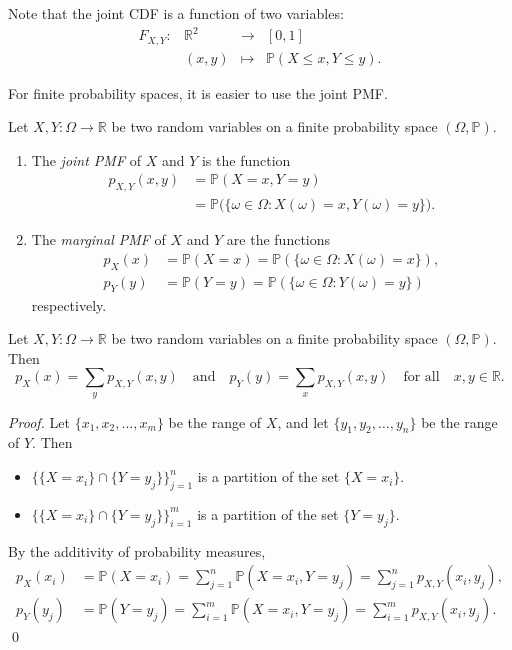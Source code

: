 \documentclass[lecture]{csm}
\newcommand{\R}{\mathbb{R}}
\newcommand{\prob}{\mathbb{P}}
\def\it{\item}
\def\bit{\begin{itemize}}
\def\eit{\end{itemize}}
\def\ben{\begin{enumerate}}
\def\een{\end{enumerate}}
\begin{document}
Note that the joint CDF is a function of two variables:
\[
\begin{array}{cccl}
F_{X,Y}:	& \mathbb{R}^2	& \longrightarrow	& [0,1] \\
		& (x,y) 			& \mapsto			& \prob(X\leq x, Y\leq y).
\end{array}
\]

\newpage %

For finite probability spaces, it is easier to use the joint PMF.

\begin{definition}
Let $X,Y:\Omega\to\R$ be two random variables on a finite probability space $(\Omega,\prob)$.
\ben
\it The \emph{joint PMF} of $X$ and $Y$ is the function
\begin{align*}
p_{X,Y}(x,y) 
	& = \prob(X=x, Y=y) \\
	& = \prob\big(\{\omega\in\Omega : X(\omega)=x, Y(\omega)=y\}\big).
\end{align*}
\it The \emph{marginal PMF} of $X$ and $Y$ are the functions
\begin{align*}
p_X(x)	& = \prob(X=x) = \prob(\{\omega\in\Omega : X(\omega)=x\}), \\
p_Y(y)	& = \prob(Y=y) = \prob(\{\omega\in\Omega : Y(\omega)=y\})
\end{align*}
respectively.
\een
\end{definition}

\newpage

\begin{lemma}
Let $X,Y:\Omega\to\R$ be two random variables on a finite probability space $(\Omega,\prob)$. Then
\[
p_X(x) = \sum_y p_{X,Y}(x,y) \quad\text{and}\quad p_Y(y) = \sum_x p_{X,Y}(x,y) \quad\text{for all}\quad x,y\in\R.
\]
\end{lemma}

\begin{proof}
Let $\{x_1,x_2,\ldots,x_m\}$ be the range of $X$, and let $\{y_1,y_2,\ldots,y_n\}$ be the range of $Y$. Then
\bit
\it $\big\{\{X=x_i\}\cap\{Y=y_j\}\big\}_{j=1}^n$ is a partition of the set $\{X=x_i\}$.
\it $\big\{\{X=x_i\}\cap\{Y=y_j\}\big\}_{i=1}^m$ is a partition of the set $\{Y=y_j\}$.
\eit
By the additivity of probability measures,
\begin{align*}
p_X(x_i) & =\prob(X=x_i) = \sum_{j=1}^n \prob(X=x_i,Y=y_j) = \sum_{j=1}^n p_{X,Y}(x_i,y_j), \\
p_Y(y_j) & =\prob(Y=y_j) = \sum_{i=1}^m \prob(X=x_i,Y=y_j) = \sum_{i=1}^m p_{X,Y}(x_i,y_j).
\end{align*}
\qed
\end{proof}
\end{document}
